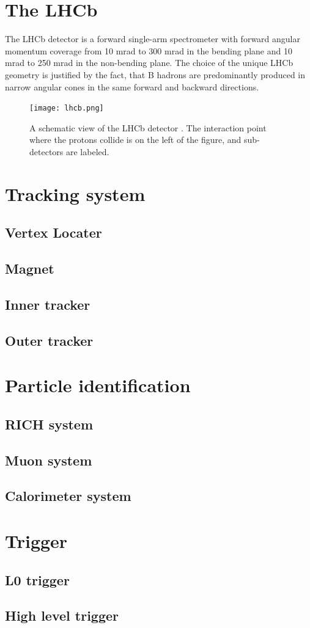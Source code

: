 \section{The LHCb}
\label{ch_lhcb:lhcb}
The LHCb detector is a forward single-arm spectrometer with forward angular
momentum coverage from 10 mrad to 300 mrad in the bending plane and 10 mrad to
250 mrad in the non-bending plane. The choice of the unique LHCb geometry is
justified by the fact, that B hadrons are predominantly produced in narrow
angular cones in the same forward and backward directions.

\begin{figure}[H]
\label{fig:lhcb}
\begin{center}
\texttt{[image: lhcb.png]}
\end{center}
\caption{\small A schematic view of the LHCb detector \cite{Alves:2008zz}. The interaction point
where the protons collide is on the left of the figure, and sub-detectors
are labeled.}
\end{figure}

\section{Tracking system}
\subsection{Vertex Locater}
\subsection{Magnet}
\subsection{Inner tracker}
\subsection{Outer tracker}

\section{Particle identification}
\subsection{RICH system}
\subsection{Muon system}
\subsection{Calorimeter system}

\section{Trigger}
\subsection{L0 trigger}
\subsection{High level trigger}